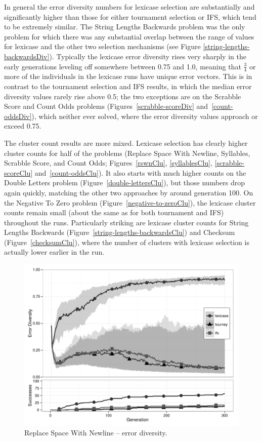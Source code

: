 In general the error diversity numbers for lexicase selection are substantially and significantly
higher than those for either tournament selection or IFS, which tend to be extremely similar.
The String Lengths Backwards problem was the only problem for which there was any substantial overlap 
between the range of values for lexicase and the other two selection mechanisms (see 
Figure \ref{string-lengths-backwardsDiv}). Typically the lexicase error diversity rises very sharply
in the early generations leveling off somewhere between 0.75 and 1.0, meaning that $\frac{3}{4}$ or
more of the individuals in the lexicase runs have unique error vectors. This is in contrast
to the tournament selection and IFS results, in which the median error diversity values rarely rise above
0.5; the two exceptions are on the Scrabble Score and Count Odds problems 
(Figures~\ref{scrabble-scoreDiv} and~\ref{count-oddsDiv}), which neither ever
solved, where the error diversity values approach or exceed 0.75.

The cluster count results are more mixed. Lexicase selection has clearly higher cluster counts for
half of the problems (Replace Space With Newline, Syllables, Scrabble Score, and Count Odds;
Figures~\ref{rswnClu}, \ref{syllablesClu}, \ref{scrabble-scoreClu} and~\ref{count-oddsClu}).
It also starts with much higher counts on the Double Letters problem (Figure~\ref{double-lettersClu}), 
but those numbers drop again quickly, matching the other two approaches by around generation 100. 
On the Negative To Zero problem (Figure~\ref{negative-to-zeroClu}), the lexicase
cluster counts remain small (about the same as for both tournament and IFS) throughout the runs.
Particularly striking are lexicase cluster counts for String Lengths Backwards (Figure~\ref{string-lengths-backwardsClu}) and Checksum (Figure~\ref{checksumClu}), where the
number of clusters with lexicase selection is actually lower earlier in the run.

\begin{figure}[p] %
\centering
\includegraphics[width=11.5cm]{replace-space-with-newline-diversity.pdf}
\caption{Replace Space With Newline -- error diversity.}
\label{rswnDiv}
\end{figure}

